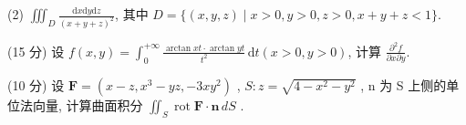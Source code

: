 (2) $\iiint_{D} \frac{\mathrm{d}x\mathrm{d}y\mathrm{d}z}{(x + y + z)^2}$, 其中 $D = \{(x, y, z) \mid x > 0, y > 0, z > 0, x + y + z < 1\}$.\par
(15 分) 设 $f(x, y) = \int_{0}^{+\infty} \frac{\arctan xt \cdot \arctan yt}{t^2} \, \mathrm{d}t (x > 0, y > 0)$, 计算 $\frac{\partial^2 f}{\partial x \partial y}$.\par
(10 分) 设  $\boldsymbol{F} = (x - z, x^{3} - yz, -3xy^{2})$ ,  $S: z = \sqrt{4 - x^{2} - y^{2}}$ , n 为 S 上侧的单位法向量, 计算曲面积分  $\iint_{S} \operatorname{rot} \boldsymbol{F} \cdot \boldsymbol{n} \, dS$ .\par
